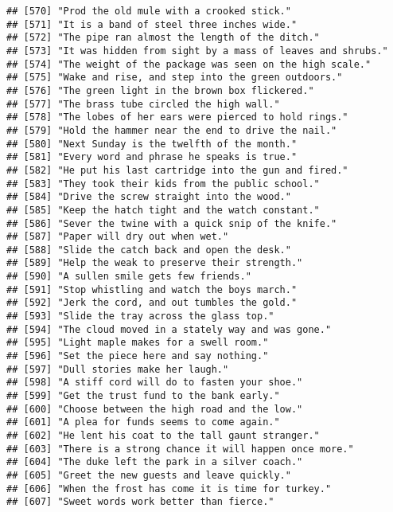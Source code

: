 \documentclass[
]{article}
\begin{document}
\begin{verbatim}
## [570] "Prod the old mule with a crooked stick."                  
## [571] "It is a band of steel three inches wide."                 
## [572] "The pipe ran almost the length of the ditch."             
## [573] "It was hidden from sight by a mass of leaves and shrubs." 
## [574] "The weight of the package was seen on the high scale."    
## [575] "Wake and rise, and step into the green outdoors."         
## [576] "The green light in the brown box flickered."              
## [577] "The brass tube circled the high wall."                    
## [578] "The lobes of her ears were pierced to hold rings."        
## [579] "Hold the hammer near the end to drive the nail."          
## [580] "Next Sunday is the twelfth of the month."                 
## [581] "Every word and phrase he speaks is true."                 
## [582] "He put his last cartridge into the gun and fired."        
## [583] "They took their kids from the public school."             
## [584] "Drive the screw straight into the wood."                  
## [585] "Keep the hatch tight and the watch constant."             
## [586] "Sever the twine with a quick snip of the knife."          
## [587] "Paper will dry out when wet."                             
## [588] "Slide the catch back and open the desk."                  
## [589] "Help the weak to preserve their strength."                
## [590] "A sullen smile gets few friends."                         
## [591] "Stop whistling and watch the boys march."                 
## [592] "Jerk the cord, and out tumbles the gold."                 
## [593] "Slide the tray across the glass top."                     
## [594] "The cloud moved in a stately way and was gone."           
## [595] "Light maple makes for a swell room."                      
## [596] "Set the piece here and say nothing."                      
## [597] "Dull stories make her laugh."                             
## [598] "A stiff cord will do to fasten your shoe."                
## [599] "Get the trust fund to the bank early."                    
## [600] "Choose between the high road and the low."                
## [601] "A plea for funds seems to come again."                    
## [602] "He lent his coat to the tall gaunt stranger."             
## [603] "There is a strong chance it will happen once more."       
## [604] "The duke left the park in a silver coach."                
## [605] "Greet the new guests and leave quickly."                  
## [606] "When the frost has come it is time for turkey."           
## [607] "Sweet words work better than fierce."                     

\end{verbatim}
\end{document}
